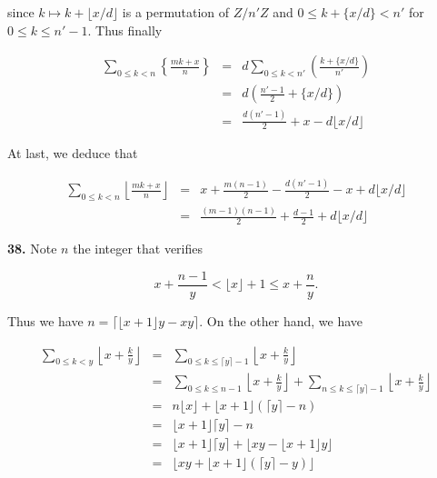 \documentclass[a4paper,12pt]{article}
\newcommand{\newpar}[1]{\bigskip \noindent \textbf{#1.}}
\begin{document}
since $k \mapsto k + \lfloor x/d\rfloor$ is a permutation of $Z/n'Z$
and $0 \le k + \{x/d\} < n'$ for $0\le k \le n'-1$.  Thus finally

\begin{eqnarray*}
  \sum_{0\le k<n}\left\{ \frac{mk+x}{n} \right\} &=& d \sum_{0\le
    k<n'}\left( \frac{k + \{x/d\}}{n'} \right) \\ &=&
  d \left( \frac{n'-1}{2} + \{x/d\} \right) \\ &=&
  \frac{d(n'-1)}{2} + x - d \lfloor x/d\rfloor
\end{eqnarray*}

At last, we deduce that

\begin{eqnarray*}
  \sum_{0\le k<n}\left\lfloor \frac{mk+x}{n} \right\rfloor &=& x +
  \frac{m(n-1)}{2} - \frac{d(n'-1)}{2} - x + d \lfloor x/d\rfloor
  \\ &=& \frac{(m-1)(n-1)}{2} + \frac{d-1}{2} + d \lfloor x/d\rfloor
\end{eqnarray*}

\newpar{38}  Note $n$ the integer that verifies

\[ x + \frac{n-1}{y} < \lfloor x\rfloor + 1 \le x + \frac{n}{y} .\]

Thus we have $n = \lceil \lfloor x + 1\rfloor y - x y\rceil$.   On the
other hand, we have

\begin{eqnarray*}
  \sum_{0\le k <y}\left\lfloor x + \frac{k}{y}\right\rfloor &=&
  \sum_{0\le k\le\lceil y\rceil -1}\left\lfloor x +
  \frac{k}{y}\right\rfloor \\ &=&
  \sum_{0\le k\le n-1}\left\lfloor x + \frac{k}{y}\right\rfloor +
  \sum_{n\le k\le \lceil y\rceil - 1}\left\lfloor x +
  \frac{k}{y}\right\rfloor \\ &=&
  n\lfloor x\rfloor + \lfloor x+1\rfloor(\lceil y\rceil - n) \\ &=&
  \lfloor x+1\rfloor \lceil y\rceil - n \\ &=&
  \lfloor x+1\rfloor \lceil y\rceil + \lfloor xy - \lfloor x+1\rfloor
  y\rfloor \\ &=&
  \lfloor xy + \lfloor x+1\rfloor(\lceil y\rceil - y)\rfloor
\end{eqnarray*}
\end{document}
